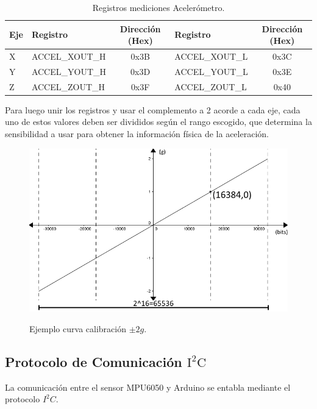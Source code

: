 \documentclass[12pt,a4paper]{article}
\begin{document}
\begin{itemize}
	\begin{table}[H]
		\centering
		\label{table:registrosaccel}
		\begin{tabular}{|l|l|c|l|c|}
			\hline
			\textbf{Eje} & \textbf{Registro} & \textbf{Dirección (Hex)} & \textbf{Registro} & \textbf{Dirección (Hex)} \\ \hline
			X            & ACCEL\_XOUT\_H     & 0x3B                     & ACCEL\_XOUT\_L     & 0x3C                     \\ \hline
			Y            & ACCEL\_YOUT\_H     & 0x3D                     & ACCEL\_YOUT\_L     & 0x3E                     \\ \hline
			Z            & ACCEL\_ZOUT\_H     & 0x3F                     & ACCEL\_ZOUT\_L     & 0x40                     \\ \hline
		\end{tabular}
		\caption{Registros mediciones Acelerómetro.}					
	\end{table}				
	
	Para luego unir los registros y usar el complemento a 2 acorde a cada eje, cada uno de estos valores deben ser divididos según el rango escogido, que determina la sensibilidad a usar para obtener la información física de la aceleración.
	
	\begin{figure}[H]
		\centering
		\includegraphics[scale=0.6]{images/curvacalibracion}
		\label{fig:curvacalibracion}
		\caption{Ejemplo curva calibración $\pm 2g$.}
	\end{figure}
	
\end{itemize}



\subsection{Protocolo de Comunicación $\mathbf{\mathrm{I^2C}}$}
La comunicación entre el sensor MPU6050 y Arduino se entabla mediante el protocolo $I^2C$.
\end{document}
